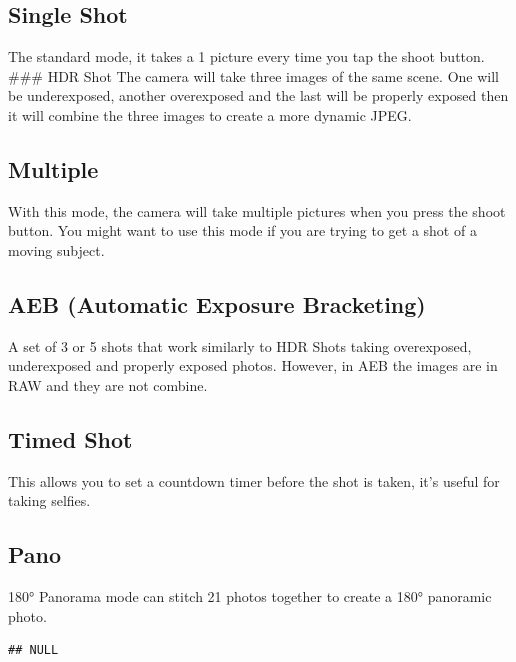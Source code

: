 \documentclass[
]{book}
\begin{document}
\hypertarget{single-shot}{%
\subsection{Single Shot}\label{single-shot}}

The standard mode, it takes a 1 picture every time you tap the shoot button.
\#\#\# HDR Shot
The camera will take three images of the same scene. One will be underexposed, another overexposed and the last will be properly exposed then it will combine the three images to create a more dynamic JPEG.

\hypertarget{multiple}{%
\subsection{Multiple}\label{multiple}}

With this mode, the camera will take multiple pictures when you press the shoot button. You might want to use this mode if you are trying to get a shot of a moving subject.

\hypertarget{aeb-automatic-exposure-bracketing}{%
\subsection{AEB (Automatic Exposure Bracketing)}\label{aeb-automatic-exposure-bracketing}}

A set of 3 or 5 shots that work similarly to HDR Shots taking overexposed, underexposed and properly exposed photos. However, in AEB the images are in RAW and they are not combine.

\hypertarget{timed-shot}{%
\subsection{Timed Shot}\label{timed-shot}}

This allows you to set a countdown timer before the shot is taken, it's useful for taking selfies.

\hypertarget{pano}{%
\subsection{Pano}\label{pano}}

180° Panorama mode can stitch 21 photos together to create a 180° panoramic photo.

\begin{verbatim}
## NULL
\end{verbatim}
\end{document}
